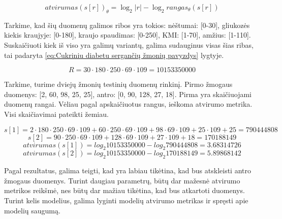 \documentclass{VUMIFInfBakalaurinis}
\begin{document}
\begin{equation}
atvirumas(s[r])_{\theta} = \log_{2}|r| - \log_{2}rangas_{\theta}(s[r])
\label{eq:Atvirumo metrika skaičiuojant rangą}
\end{equation}

\par Tarkime, kad šių duomenų galimos ribos yra tokios: nėštumai: [0-30], gliukozės kiekis kraujyje: [0-180], kraujo spaudimas: [0-250], KMI: [1-70], amžius: [1-110]. Suskaičiuoti kiek iš viso yra galimų variantų, galima sudauginus visas šias ribas, tai padaryta \eqref{eq:Cukriniu diabetu sergančių žmonių pavyzdys} lygtyje.

\begin{equation}
R = 30 \cdot 180 \cdot 250 \cdot 69 \cdot 109 = 10153350000
\label{eq:Cukriniu diabetu sergančių žmonių pavyzdys}
\end{equation}

\par Tarkime, turime dviejų žmonių testinių duomenų rinkinį. Pirmo žmogaus duomenys: [2, 60, 98, 25, 25], antro: [0, 90, 128, 27, 18]. Pirma yra skaičiuojami duomenų rangai. Vėliau pagal apskaičiuotus rangus, ieškoma atvirumo metrika. Visi skaičiavimai pateikti žemiau.

\begin{equation*}
s[1] = 2 \cdot 180 \cdot 250 \cdot 69 \cdot 109 + 60 \cdot 250 \cdot 69 \cdot 109 + 98 \cdot 69 \cdot 109 + 25 \cdot 109 + 25 = 790444808
\label{eq:Rangų skaičiavimo pavyzdys: 1}
\end{equation*}
\begin{equation*}
s[2] = 90 \cdot 250 \cdot 69 \cdot 109 + 128 \cdot 69 \cdot 109 + 27 \cdot 109 + 18 = 170188149
\label{eq:Rangų skaičiavimo pavyzdys: 2}
\end{equation*}
\begin{equation*}
atvirumas(s[1]) = log_{2} 10153350000 - log_{2} 790444808 = 3.68314726
\label{eq:Atvirumo metrikos skaičiavimo pavyzdys: 1}
\end{equation*}
\begin{equation*}
atvirumas(s[2]) = log_{2} 10153350000 - log_{2} 170188149 = 5.89868142
\label{eq:Atvirumo metrikos skaičiavimo pavyzdys: 2}
\end{equation*}

\par Pagal rezultatus, galima teigti, kad yra labiau tikėtina, kad bus atskleisti antro žmogaus duomenys. Turint daugiau parametrų, būtų dar mažesnė atvirumo metrikos reikšmė, nes būtų dar mažiau tikėtina, kad bus atkartoti duomenys. Turint kelis modelius, galima lyginti modelių atvirumo metrikas ir spręsti apie modelių saugumą.
\end{document}
